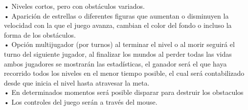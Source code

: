 \documentclass{article}
\begin{document}
•	Niveles cortos, pero con obstáculos variados.\\

•	Aparición de estrellas o diferentes figuras que aumentan o disminuyen la velocidad con la que el juego avanza, cambian el color del fondo o incluso la forma de los obstáculos.\\

•	Opción multijugador (por turnos) al terminar el nivel o al morir seguirá el turno del siguiente jugador, al finalizar los mundos al perder todas las vidas ambos jugadores se mostrarán las estadísticas, el ganador será el que haya recorrido todos los niveles en el menor tiempo posible, el cual será contabilizado desde que inicia el nivel hasta atravesar la meta.\\

•	En determinados momentos será posible disparar para destruir los obstaculos\\

•	Los controles del juego serán a través del mouse.\\ 





\end{document}
